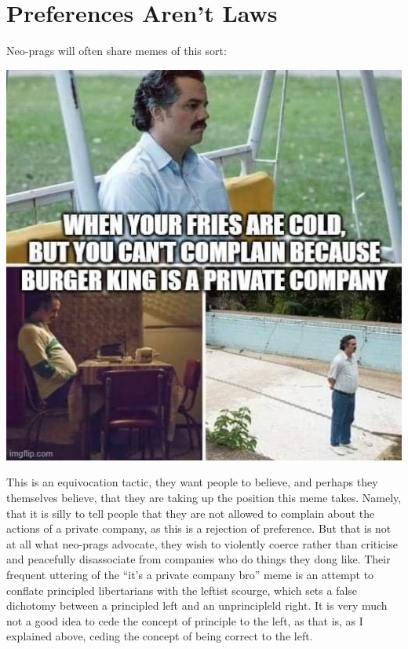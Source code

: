\documentclass[11pt]{article}
\begin{document}
\section{Preferences Aren't Laws}
\label{sec:org30097cd}
Neo-prags will often share memes of this sort:
\begin{center}
\includegraphics[width=.9\linewidth]{./images/cant-complain-fries-cold.jpg}
\end{center}

This is an equivocation tactic, they want people to believe, and perhaps they themselves believe, that they are taking up the position this meme takes. Namely, that it is silly to tell people that they are not allowed to complain about the actions of a private company, as this is a rejection of preference. But that is not at all what neo-prags advocate, they wish to violently coerce rather than criticise and peacefully disassociate from companies who do things they dong like. Their frequent uttering of the ``it's a private company bro'' meme is an attempt to conflate principled libertarians with the leftist scourge, which sets a false dichotomy between a principled left and an unprincipleld right. It is very much not a good idea to cede the concept of principle to the left, as that is, as I explained above, ceding the concept of being correct to the left.
\end{document}
